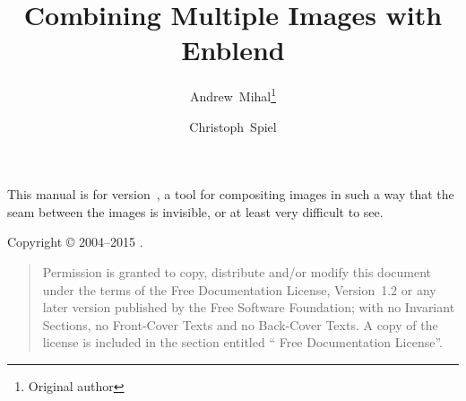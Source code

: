

\begin{titlepage}
  \renewcommand{\thefootnote}{\fnsymbol{footnote}}

  \author{Andrew~Mihal\footnote{Original author} \and Christoph~Spiel}

  \title{Combining Multiple Images with Enblend }

  \date{}

  \maketitle
\end{titlepage}


\vspace*{\fill}
\ifhevea\relax\else \begin{center}\end{center}\fi
\label{sec:abstract}\noindent This manual is for \App{}
version~, a tool for compositing images in such a way
that the seam between the images is invisible, or at least very
difficult to see.

\vspace*{\fill}
\noindent Copyright \copyright{} 2004--2015 .

\begin{quotation}
  \noindent Permission is granted to copy, distribute and/or modify
  this document under the terms of the  Free
  Documentation License, Version~1.2 or any later version published by
  the Free Software Foundation; with no Invariant Sections, no
  Front-Cover Texts and no Back-Cover Texts.  A copy of the license is
  included in the section entitled `` Free Documentation
  License''.
\end{quotation}

\cleardoublepage{}
